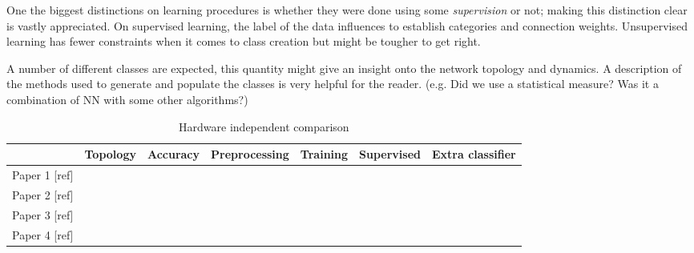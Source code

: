 One the biggest distinctions on learning procedures is whether they were done using some \emph{supervision} or not; making this distinction clear is vastly appreciated. On supervised learning, the label of the data influences to establish categories and connection weights. Unsupervised learning has fewer constraints when it comes to class creation but might be tougher to get right. 

A number of different classes are expected, this quantity might give an insight onto the network topology and dynamics. A description of the methods used to generate and populate the classes is very helpful for the reader. (e.g. Did we use a statistical measure? Was it a combination of NN with some other algorithms?)

\begin{table*}
  \caption{Hardware independent comparison}
  \begin{center}
    \bgroup
    \def\arraystretch{1.4}
    \begin{tabular}{ l | c c c c c c }
      $ $ &
      \begin{minipage}{1.9cm}Topology \end{minipage} & 
      \begin{minipage}{1.9cm}Accuracy \end{minipage} & 
      \begin{minipage}{1.9cm}Preprocessing \end{minipage} &
      \begin{minipage}{1.9cm}Training \end{minipage} & 
      \begin{minipage}{1.9cm}Supervised \end{minipage} &
      \begin{minipage}{1.9cm}Extra classifier \end{minipage} \\
      \hline
      \begin{minipage}{2cm} Paper 1 [ref] \end{minipage}  & & & & & & \\
      \begin{minipage}{2cm} Paper 2 [ref]\end{minipage}  & & & & & & \\
      \begin{minipage}{2cm} Paper 3 [ref]\end{minipage}  & & & & & & \\
      \begin{minipage}{2cm} Paper 4 [ref]\end{minipage}  & & & & & & 
    \end{tabular}
    \egroup
  \end{center}
  \label{tb:software_comparison}
\end{table*}


